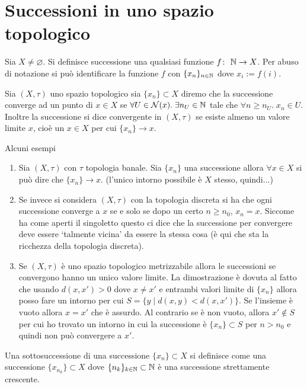 \section{Successioni in uno spazio topologico}
\begin{definition}
	Sia $X \neq \varnothing$. Si definisce successione una qualsiasi funzione $f \colon\ \mathbb{N} \rightarrow X$. Per abuso di notazione si può identificare la funzione $f$ con $\{x_n\}_{n\in\mathbb{N}}$ dove $x_i := f(i)$.
\end{definition}

\begin{definition}
	Sia $(X, \tau)$ uno spazio topologico sia $\{x_n\} \subset X$ diremo che la successione converge ad un punto di $x \in X$ se $\forall U \in \mathcal{N}(x) . \; \exists n_U \in \mathbb{N}$ tale che $\forall n \ge n_U . \; x_n \in U$. Inoltre la successione si dice convergente in $(X,\tau)$ se esiste almeno un valore limite $x$, cioè un $x \in X$ per cui $\{x_n\} \rightarrow x$.
\end{definition}

Alcuni esempi 
\begin{enumerate}
	\item Sia $(X,\tau)$ con $\tau$ topologia banale. Sia $\{x_n\}$ una successione allora $\forall x \in X$ si può dire che $\{x_n\} \rightarrow x$. (l'unico intorno possibile è $X$ stesso, quindi...)
	\item Se invece si considera $(X,\tau)$ con la topologia discreta si ha che ogni successione converge a $x$ se e solo se dopo un certo $n \ge n_0$, $x_n = x$. Siccome ha come aperti il singoletto questo ci dice che la successione per convergere deve essere `talmente vicina' da essere la stessa cosa (è qui che sta la ricchezza della topologia discreta).
 	\item Se $(X,\tau)$ è uno spazio topologico metrizzabile allora le successioni se convergono hanno un unico valore limite. La dimostrazione è dovuta al fatto che usando $d(x,x') > 0$ dove $x \neq x' $ e entrambi valori limite di $\{x_n\}$ allora posso fare un intorno per cui $S = \{y\; |\; d(x, y) < d(x,x')\}$. Se l'insieme è vuoto allora $x = x'$ che è assurdo. Al contrario se è non vuoto, allora $x' \not\in S$ per cui ho trovato un intorno in cui la successione è $\{x_n\} \subset S$ per $n > n_0$ e quindi non può convergere a $x'$. 
\end{enumerate}

\begin{definition}
	Una sottosuccessione di una successione $\{x_n\} \subset X$ si definisce come una successione $\{x_{n_k}\} \subset X$ dove $\{n_k\}_{k\in \mathbb{N}} \subset \mathbb{N}$ è una successione strettamente crescente. 
\end{definition}

